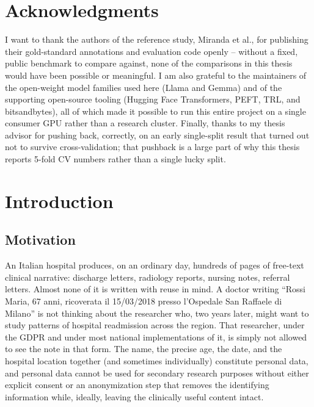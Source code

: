 \documentclass[12pt,a4paper]{report}
\begin{document}
\chapter*{Acknowledgments}

I want to thank the authors of the reference study, Miranda et al., for publishing their gold-standard annotations and evaluation code openly -- without a fixed, public benchmark to compare against, none of the comparisons in this thesis would have been possible or meaningful. I am also grateful to the maintainers of the open-weight model families used here (Llama and Gemma) and of the supporting open-source tooling (Hugging Face Transformers, PEFT, TRL, and bitsandbytes), all of which made it possible to run this entire project on a single consumer GPU rather than a research cluster. Finally, thanks to my thesis advisor for pushing back, correctly, on an early single-split result that turned out not to survive cross-validation; that pushback is a large part of why this thesis reports 5-fold CV numbers rather than a single lucky split.

\newpage

\tableofcontents
\newpage
\listoffigures
\newpage
\listoftables
\newpage


\chapter{Introduction}
\label{ch:intro}

\section{Motivation}

An Italian hospital produces, on an ordinary day, hundreds of pages of free-text clinical narrative: discharge letters, radiology reports, nursing notes, referral letters. Almost none of it is written with reuse in mind. A doctor writing ``Rossi Maria, 67 anni, ricoverata il 15/03/2018 presso l'Ospedale San Raffaele di Milano'' is not thinking about the researcher who, two years later, might want to study patterns of hospital readmission across the region. That researcher, under the GDPR and under most national implementations of it, is simply not allowed to see the note in that form. The name, the precise age, the date, and the hospital location together (and sometimes individually) constitute personal data, and personal data cannot be used for secondary research purposes without either explicit consent or an anonymization step that removes the identifying information while, ideally, leaving the clinically useful content intact.
\end{document}
